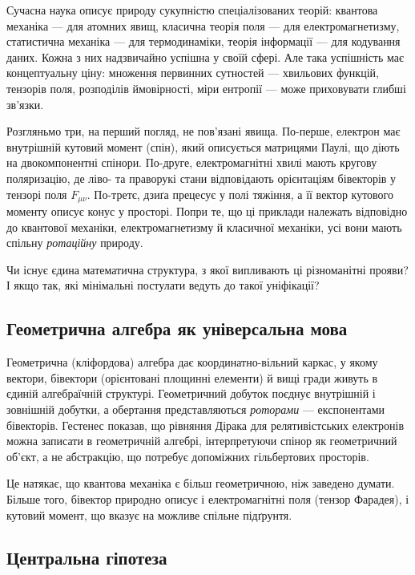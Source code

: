 \documentclass[11pt,a4paper]{article}
\theoremstyle{definition}
\theoremstyle{plain}
\theoremstyle{remark}
\begin{document}
Сучасна наука описує природу сукупністю спеціалізованих теорій: квантова механіка — для атомних явищ, класична теорія поля — для електромагнетизму, статистична механіка — для термодинаміки, теорія інформації — для кодування даних. Кожна з них надзвичайно успішна у своїй сфері. Але така успішність має концептуальну ціну: множення первинних сутностей — хвильових функцій, тензорів поля, розподілів ймовірності, міри ентропії — може приховувати глибші зв’язки.

Розгляньмо три, на перший погляд, не пов’язані явища. По-перше, електрон має внутрішній кутовий момент (спін), який описується матрицями Паулі, що діють на двокомпонентні спінори. По-друге, електромагнітні хвилі мають кругову поляризацію, де ліво- та праворукі стани відповідають орієнтаціям бівекторів у тензорі поля $F_{\mu\nu}$. По-третє, дзиґа прецесує у полі тяжіння, а її вектор кутового моменту описує конус у просторі. Попри те, що ці приклади належать відповідно до квантової механіки, електромагнетизму й класичної механіки, усі вони мають спільну \emph{ротаційну} природу.

Чи існує єдина математична структура, з якої випливають ці різноманітні прояви? І якщо так, які мінімальні постулати ведуть до такої уніфікації?

\subsection{Геометрична алгебра як універсальна мова}

Геометрична (кліфордова) алгебра дає координатно-вільний каркас, у якому вектори, бівектори (орієнтовані площинні елементи) й вищі гради живуть в єдиній алгебраїчній структурі. Геометричний добуток поєднує внутрішній і зовнішній добутки, а обертання представляються \emph{роторами} — експонентами бівекторів. Гестенес показав, що рівняння Дірака для релятивістських електронів можна записати в геометричній алгебрі, інтерпретуючи спінор як геометричний об’єкт, а не абстракцію, що потребує допоміжних гільбертових просторів.

Це натякає, що квантова механіка є більш геометричною, ніж заведено думати. Більше того, бівектор природно описує і електромагнітні поля (тензор Фарадея), і кутовий момент, що вказує на можливе спільне підґрунтя.

\subsection{Центральна гіпотеза}
\end{document}
